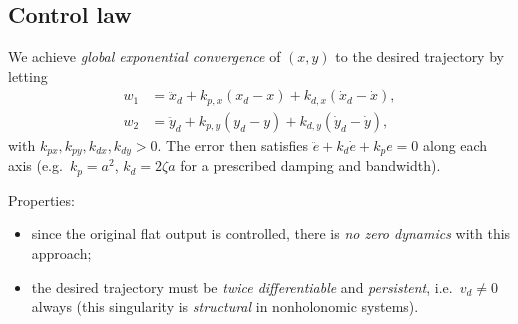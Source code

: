 \documentclass[11pt,a4paper]{article}
\newcommand{\vd}{v_d}
\theoremstyle{plain}
\theoremstyle{definition}
\theoremstyle{remark}
\begin{document}
\subsection{Control law}

We achieve \emph{global exponential convergence} of $(x,y)$ to the desired trajectory by letting
\begin{align}
w_1&=\ddot x_d+k_{p,x}(x_d-x)+k_{d,x}(\dot x_d-\dot x),\\
w_2&=\ddot y_d+k_{p,y}(y_d-y)+k_{d,y}(\dot y_d-\dot y),
\end{align}
with $k_{px},k_{py},k_{dx},k_{dy}>0$. The error then satisfies $\ddot e+k_d\dot e+k_pe=0$ along each axis (e.g.\ $k_p=a^2$, $k_d=2\zeta a$ for a prescribed damping and bandwidth).

Properties:
\begin{itemize}[nosep]
\item since the original flat output is controlled, there is \emph{no zero dynamics} with this approach;
\item the desired trajectory must be \emph{twice differentiable} and \emph{persistent}, i.e.\ $\vd\neq0$ always (this singularity is \emph{structural} in nonholonomic systems).
\end{itemize}
\end{document}
